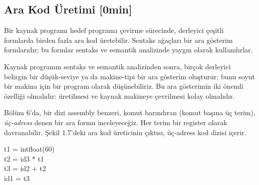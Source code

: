 \subsection{Ara Kod Üretimi [0min]}
Bir kaynak programı hedef programa çevirme sürecinde, derleyici çeşitli formlarda birden fazla ara kod üretebilir. Sentaks ağaçları bir ara gösterim formlarıdır; bu formlar sentaks ve semantik analizinde yaygın olarak kullanılırlar.

Kaynak programın sentaks ve semantik analizinden sonra, birçok derleyici belirgin bir düşük-seviye ya da makine-tipi bir ara gösterim oluşturur; bunu soyut bir makina için bir program olarak düşünebiliriz. Bu ara gösterimin iki önemli özelliği olmalıdır: üretilmesi ve kaynak makineye çevrilmesi kolay olmalıdır.

Bölüm 6'da, bir dizi assembly benzeri, komut barındıran (komut başına üç terim), \textit{üç-adress} denen bir ara formu inceleyeceğiz. Her terim bir register olarak davranabilir. Şekil 1.7'deki ara kod üreticinin çıktısı, üç-adress kod dizisi içerir.

\begin{center}
\begin{flushleft}
t1 = intfloat(60) \\
t2 = id3 * t1\\ 
t3 = id2 + t2\\
id1 = t3
\end{flushleft}
		  
\end{center}
